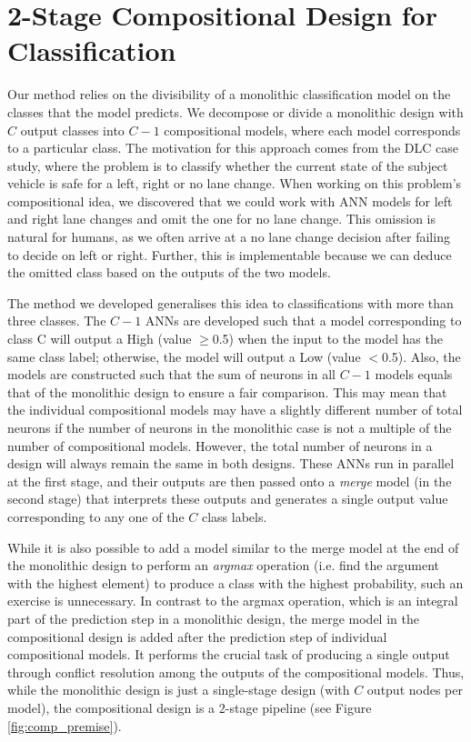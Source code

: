 \section{2-Stage Compositional Design for Classification}
\label{sec:Class}
Our method relies on the divisibility of a monolithic classification model on the classes that the model predicts. We decompose or divide a monolithic design with $C$ output classes into $C-1$ compositional models, where each model corresponds to a particular class. The motivation for this approach comes from the DLC case study, where the problem is to classify whether the current state of the subject vehicle is safe for a left, right or no lane change. When working on this problem's compositional idea, we discovered that we could work with ANN models for left and right lane changes and omit the one for no lane change. This omission is natural for humans, as we often arrive at a no lane change decision after failing to decide on left or right. Further, this is implementable because we can deduce the omitted class based on the outputs of the two models. 

The method we developed generalises this idea to classifications with more than three classes. The $C-1$ ANNs are developed such that a model corresponding to class $\text{C}$ will output a High (value $\geq$0.5) when the input to the model has the same class label; otherwise, the model will output a Low (value $<$0.5). Also, the models are constructed such that the sum of neurons in all $C-1$ models equals that of the monolithic design to ensure a fair comparison. This may mean that the individual compositional models may have a slightly different number of total neurons if the number of neurons in the monolithic case is not a multiple of the number of compositional models. However, the total number of neurons in a design will always remain the same in both designs. These ANNs run in parallel at the first stage, and their outputs are then passed onto a \emph{merge} model (in the second stage) that interprets these outputs and generates a single output value corresponding to any one of the $C$ class labels.

While it is also possible to add a model similar to the merge model at the end of the monolithic design to perform an \emph{argmax} operation (i.e. find the argument with the highest element) to produce a class with the highest probability, such an exercise is unnecessary. In contrast to the argmax operation, which is an integral part of the prediction step in a monolithic design, the merge model in the compositional design is added after the prediction step of individual compositional models. It performs the crucial task of producing a single output through conflict resolution among the outputs of the compositional models. Thus, while the monolithic design is just a single-stage design (with $C$ output nodes per model), the compositional design is a 2-stage pipeline (see Figure \ref{fig:comp_premise}). 

